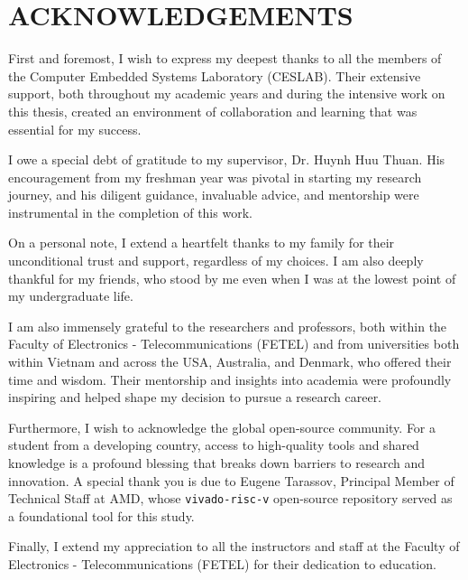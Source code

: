 \chapter*{ACKNOWLEDGEMENTS}
\label{thanks}

First and foremost, I wish to express my deepest thanks to all the members of the Computer Embedded Systems Laboratory (CESLAB). Their extensive support, both throughout my academic years and during the intensive work on this thesis, created an environment of collaboration and learning that was essential for my success.

I owe a special debt of gratitude to my supervisor, Dr. Huynh Huu Thuan. His encouragement from my freshman year was pivotal in starting my research journey, and his diligent guidance, invaluable advice, and mentorship were instrumental in the completion of this work.

On a personal note, I extend a heartfelt thanks to my family for their unconditional trust and support, regardless of my choices. I am also deeply thankful for my friends, who stood by me even when I was at the lowest point of my undergraduate life.

I am also immensely grateful to the researchers and professors, both within the Faculty of Electronics - Telecommunications (FETEL) and from universities both within Vietnam and across the USA, Australia, and Denmark, who offered their time and wisdom. Their mentorship and insights into academia were profoundly inspiring and helped shape my decision to pursue a research career.

Furthermore, I wish to acknowledge the global open-source community. For a student from a developing country, access to high-quality tools and shared knowledge is a profound blessing that breaks down barriers to research and innovation. A special thank you is due to Eugene Tarassov, Principal Member of Technical Staff at AMD, whose \texttt{vivado-risc-v} open-source repository served as a foundational tool for this study.

Finally, I extend my appreciation to all the instructors and staff at the Faculty of Electronics - Telecommunications (FETEL) for their dedication to education.




